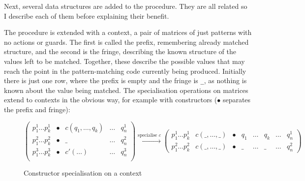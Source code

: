 


Next, several data structures are added to the procedure. They are all related so I describe each of them before explaining their benefit. 

The procedure is extended with a context, a pair of matrices of just patterns with no actions or guards. The first is called the prefix, remembering already matched structure, and the second is the fringe, describing the known structure of the values left to be matched. Together, these describe the possible values that may reach the point in the pattern-matching code currently being produced. Initially there is just one row, where the prefix is empty and the fringe is \verb|_|, as nothing is known about the value being matched. The specialisation operations on matrices extend to contexts in the obvious way, for example with constructors ($\bullet$ separates the prefix and fringe):

\begin{figure}[H]
$
\begin{pmatrix}
 p^1_1 \dots  p^1_k & \bullet & c(q_1, \dots, q_k) & \dots & q^1_n \\
 p^2_1 \dots  p^2_k & \bullet & \_ & \dots & q^2_n \\
 p^3_1 \dots  p^3_k &\bullet & c'(\dots)  & \dots & q^3_n  \\
\end{pmatrix}
\xrightarrow{\text{specialise } c}
\begin{pmatrix}
p^1_1 \dots  p^1_k  & c(\_, \dots, \_) & \bullet &  q_1 & \dots & q_k & \dots &  q^1_n \\
 p^2_1 \dots  p^2_k & c(\_, \dots, \_) & \bullet & \_ & \dots & \_ & \dots & q^2_n
\end{pmatrix}
$
\caption{Constructor specialisation on a context}
\end{figure}

